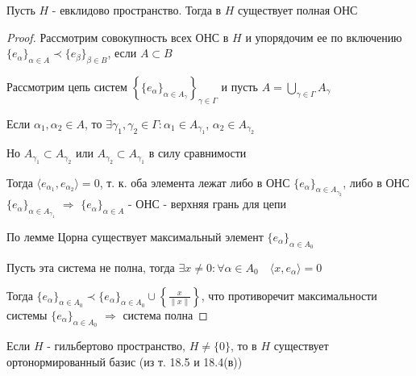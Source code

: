 \documentclass[a4paper,12pt]{report}
\begin{document}
\begin{thm}
Пусть $H$ - евклидово пространство. Тогда в $H$ существует полная ОНС
\end{thm}
\begin{proof}
Рассмотрим совокупность всех ОНС в $H$ и упорядочим ее по включению $\{e_\alpha\}_{\alpha\in A}\prec\{e_\beta\}_{\beta\in B}$, если $A\subset B$

Рассмотрим цепь систем $\left\{\{e_\alpha\}_{\alpha\in A_\gamma}\right\}_{\gamma\in\Gamma}$ и пусть $A=\bigcup\limits_{\gamma\in\Gamma}A_\gamma$

Если $\alpha_1,\alpha_2\in A$, то $\exists\gamma_1,\gamma_2\in\Gamma\colon\alpha_1\in A_{\gamma_1}$, $\alpha_2\in A_{\gamma_2}$

Но $A_{\gamma_1}\subset A_{\gamma_2}$ или $A_{\gamma_2}\subset A_{\gamma_1}$ в силу сравнимости

Тогда $\langle e_{\alpha_1},e_{\alpha_2}\rangle=0$, т. к. оба элемента лежат либо в ОНС $\{e_\alpha\}_{\alpha\in A_{\gamma_2}}$, либо в ОНС $\{e_\alpha\}_{\alpha\in A_{\gamma_1}}$ $\Rightarrow$ $\{e_\alpha\}_{\alpha\in A}$ - ОНС - верхняя грань для цепи

По лемме Цорна существует максимальный элемент $\{e_\alpha\}_{\alpha\in A_0}$

Пусть эта система не полна, тогда $\exists x\ne0\colon\forall\alpha\in A_0\quad\langle x,e_\alpha\rangle=0$

Тогда $\{e_\alpha\}_{\alpha\in A_0}\prec\{e_\alpha\}_{\alpha\in A_0}\cup\left\{\frac{x}{\|x\|}\right\}$, что противоречит максимальности системы $\{e_\alpha\}_{\alpha\in A_0}$ $\Rightarrow$ система полна
\end{proof}
 


\begin{cons}
Если $H$ - гильбертово пространство, $H\ne\{0\}$, то в $H$ существует ортонормированный базис (из т. 18.5 и 18.4(в))
\end{cons}
 
\end{document}
